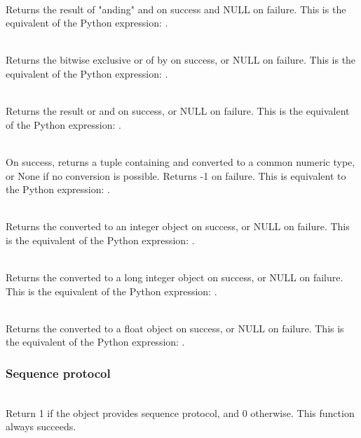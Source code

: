      \\
	 Returns the result of "anding"  and  on success and NULL
	 on failure. This is the equivalent of the Python
	 expression: .


     \\
	 Returns the bitwise exclusive or of  by  on success, or
	 NULL on failure.  This is the equivalent of the Python
	 expression: .

     \\
	 Returns the result or  and  on success, or NULL on
	 failure.  This is the equivalent of the Python expression: 
	 .


     \\
         On success, returns a tuple containing  and  converted to
	 a common numeric type, or None if no conversion is possible.
	 Returns -1 on failure. This is equivalent to the Python
	 expression: .


     \\
	 Returns the  converted to an integer object on success, or
	 NULL on failure.  This is the equivalent of the Python
	 expression: .


     \\
	 Returns the  converted to a long integer object on success,
	 or NULL on failure.  This is the equivalent of the Python
	 expression: .


     \\
	 Returns the  converted to a float object on success, or NULL
	 on failure.  This is the equivalent of the Python expression:
	 .


\subsubsection{Sequence protocol}

     \\
         Return 1 if the object provides sequence protocol, and 0
	 otherwise.  
	 This function always succeeds.


